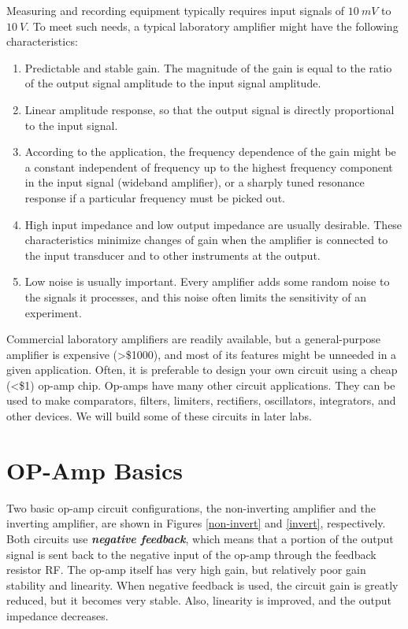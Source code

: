 \documentclass[10pt]{PhysLab1C} %
\begin{document}
Measuring and recording equipment typically requires input signals of $10~
mV$ to $10~ V$. To meet such needs, a typical laboratory amplifier might
have the following characteristics:

\begin{enumerate}
\def\labelenumi{\arabic{enumi}.}
\item
  Predictable and stable gain. The magnitude of the gain is equal to the
  ratio of the output signal amplitude to the input signal amplitude.
\item
  Linear amplitude response, so that the output signal is directly
  proportional to the input signal.
\item
  According to the application, the frequency dependence of the gain
  might be a constant independent of frequency up to the highest
  frequency component in the input signal (wideband amplifier), or a
  sharply tuned resonance response if a particular frequency must be
  picked out.
\item
  High input impedance and low output impedance are usually desirable.
  These characteristics minimize changes of gain when the amplifier is
  connected to the input transducer and to other instruments at the
  output.
\item
  Low noise is usually important. Every amplifier adds some random noise
  to the signals it processes, and this noise often limits the
  sensitivity of an experiment.
\end{enumerate}

Commercial laboratory amplifiers are readily available, but a
general-purpose amplifier is expensive (\textgreater{}\$1000), and most
of its features might be unneeded in a given application. Often, it is
preferable to design your own circuit using a cheap (\textless\$1)
op-amp chip. Op-amps have many other circuit applications. They can be
used to make comparators, filters, limiters, rectifiers, oscillators,
integrators, and other devices. We will build some of these circuits in
later labs.


\section{OP-Amp Basics}


Two basic op-amp circuit configurations, the non-inverting amplifier and
the inverting amplifier, are shown in Figures \ref{non-invert} and \ref{invert}, respectively.
Both circuits use \emph{\textbf{negative feedback}}, which means that a
portion of the output signal is sent back to the negative input of the
op-amp through the feedback resistor RF. The op-amp itself has very high
gain, but relatively poor gain stability and linearity. When negative
feedback is used, the circuit gain is greatly reduced, but it becomes
very stable. Also, linearity is improved, and the output impedance
decreases.
\end{document}
